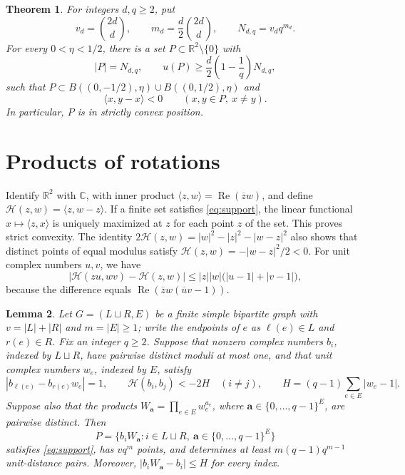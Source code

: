 \documentclass[a4paper,11pt]{amsart}
\newtheorem{theorem}{Theorem}[section]
\newtheorem{lemma}[theorem]{Lemma}
\theoremstyle{remark}
\newcommand{\R}{\mathbb R}
\newcommand{\C}{\mathbb C}
\newcommand{\Hh}{\mathcal H}
\begin{document}
\begin{theorem}\label{thm:finite}
For integers $d,q\ge2$, put
\begin{equation}\label{eq:parameters}
 v_d=\binom{2d}{d},\qquad m_d=\frac d2\binom{2d}{d},\qquad
 N_{d,q}=v_dq^{m_d}.
\end{equation}
For every $0<\eta<1/2$, there is a set $P\subset\R^2\setminus\{0\}$
with
\begin{equation}\label{eq:finite-count}
 |P|=N_{d,q},\qquad
 u(P)\ge \frac d2\left(1-\frac1q\right)N_{d,q},
\end{equation}
such that $P\subset B((0,-1/2),\eta)\cup B((0,1/2),\eta)$ and
\begin{equation}\label{eq:support}
 \langle x,y-x\rangle<0\qquad(x,y\in P,\ x\ne y).
\end{equation}
In particular, $P$ is in strictly convex position.
\end{theorem}

\section{Products of rotations}

Identify $\R^2$ with $\C$, with inner product
$\langle z,w\rangle=\operatorname{Re}(\overline z w)$, and define
$\Hh(z,w)=\langle z,w-z\rangle$.
If a finite set satisfies \eqref{eq:support}, the linear functional
$x\mapsto\langle z,x\rangle$ is uniquely maximized at $z$ for each point
$z$ of the set. This proves strict convexity.
The identity
$2\Hh(z,w)=|w|^2-|z|^2-|w-z|^2$ also shows that distinct points of equal
modulus satisfy $\Hh(z,w)=-|w-z|^2/2<0$.
For unit complex numbers $u,v$, we have
\begin{equation}\label{eq:rotation-bound}
 |\Hh(zu,wv)-\Hh(z,w)|
 \le |z||w|\bigl(|u-1|+|v-1|\bigr),
\end{equation}
because the difference equals
$\operatorname{Re}(\overline z w(\overline u v-1))$.

\begin{lemma}\label{lem:products}
Let $G=(L\sqcup R,E)$ be a finite simple bipartite graph with
$v=|L|+|R|$ and $m=|E|\ge1$; write the endpoints of $e$ as
$\ell(e)\in L$ and $r(e)\in R$.
Fix an integer $q\ge2$.
Suppose that nonzero complex numbers $b_i$, indexed by $L\sqcup R$,
have pairwise distinct moduli at most one, and that unit complex numbers
$w_e$, indexed by $E$, satisfy
\begin{equation}\label{eq:product-hypotheses}
 |b_{\ell(e)}-b_{r(e)}w_e|=1,\qquad
 \Hh(b_i,b_j)<-2H\quad(i\ne j),\qquad
 H=(q-1)\sum_{e\in E}|w_e-1|.
\end{equation}
Suppose also that the products
$W_{\mathbf a}=\prod_{e\in E}w_e^{a_e}$, where
$\mathbf a\in\{0,\ldots,q-1\}^{E}$, are pairwise distinct.
Then
\begin{equation}\label{eq:product-set}
 P=\{b_iW_{\mathbf a}:i\in L\sqcup R,\
                   \mathbf a\in\{0,\ldots,q-1\}^{E}\}
\end{equation}
satisfies \eqref{eq:support}, has $vq^m$ points, and determines at least
$m(q-1)q^{m-1}$ unit-distance pairs.
Moreover, $|b_iW_{\mathbf a}-b_i|\le H$ for every index.
\end{lemma}
\end{document}

